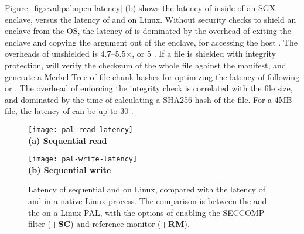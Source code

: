 Figure~\ref{fig:eval:pal:open-latency} (b) shows the latency of  inside of an SGX enclave, versus the latency of 
 and  on Linux.
Without security checks to shield an enclave from the OS,
the latency of  is dominated by the overhead of exiting the enclave and copying the argument out of the enclave,
for accessing the host \linuxapis{}.
The overheads of unshielded  is 4.7--5.5$\times$, or \roughly{}5 \usec{}.
If a file is shielded with integrity protection,
 will verify the checksum of the whole file against the manifest, and generate a Merkel Tree of file chunk hashes
for optimizing the latency of following  or .
The overhead of enforcing the integrity check is correlated with the file size, and dominated by the time of
calculating a SHA256 hash of the file.
For a 4MB file, the latency of  can be up to \roughly{}30 \msec{}.






\begin{figure*}[t!]
\centering
\footnotesize
\begin{minipage}{.49\linewidth}
\centering
\texttt{[image: pal-read-latency]}\\
{\bf (a) Sequential read}
\vspace{6pt}
\end{minipage}
\begin{minipage}{.49\linewidth}
\centering
\texttt{[image: pal-write-latency]}\\
{\bf (b) Sequential write}
\vspace{6pt}
\end{minipage}
\caption{Latency of sequential  and  on Linux, compared with the latency of  and  \linuxapis{} in a native Linux process. The comparison is between the \linuxapis{} and the \hostapis{} on a Linux PAL,
with the options of enabling the SECCOMP filter ({\bf +SC})
and reference monitor ({\bf +RM}).}
\label{fig:eval:pal:read-write-latency}
\end{figure*}


